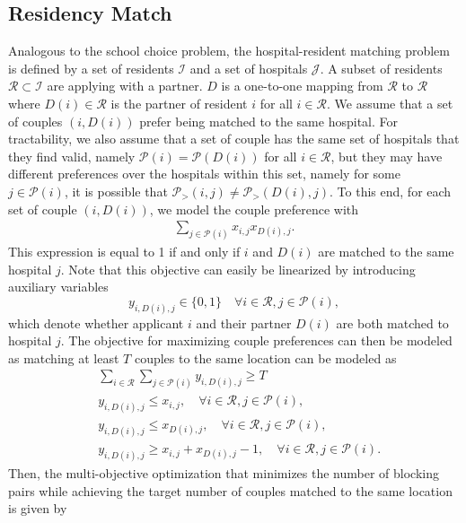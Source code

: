 \documentclass[11pt]{article}
\begin{document}
\subsection{Residency Match}
Analogous to the school choice problem, the hospital-resident matching problem is defined by a set of residents $\mathcal I$ and a set of hospitals $\mathcal J$. A subset of residents $\mathcal R \subset \mathcal I$ are applying with a partner. $D$ is a one-to-one mapping from $\mathcal{R}$ to $\mathcal{R}$ where $D(i) \in \mathcal{R}$ is the partner of resident $i$ for all $i \in \mathcal{R}$. 
We assume that a set of couples $(i, D(i))$ prefer being matched to the same hospital. 
For tractability, we also assume that a set of couple has the same set of hospitals that they find valid, namely $\mathcal P(i) = \mathcal P(D(i))$ for all $i \in \mathcal{R}$, but they may have different preferences over the hospitals within this set, namely for some $j \in \mathcal P(i)$, it is possible that $\mathcal P_>(i,j) \neq \mathcal P_>(D(i),j)$.
To this end, for each set of couple $(i, D(i))$, we model the couple preference with 
\begin{align}
    \sum_{j \in \mathcal P(i)} x_{i,j}x_{D(i),j}.
\end{align}
This expression is equal to 1 if and only if $i$ and $D(i)$ are matched to the same hospital $j$. 
Note that this objective can easily be linearized by introducing auxiliary variables 
$$
y_{i,D(i),j} \in \{0,1\} \quad \forall i \in \mathcal{R}, j \in \mathcal{P}(i), 
$$
which denote whether applicant $i$ and their partner $D(i)$ are both matched to hospital $j$.
The objective for maximizing couple preferences can then be modeled as matching at least $T$ couples to the same location can be modeled as 
\begin{align} 
    & \sum_{i \in \mathcal{R}} \sum_{j \in \mathcal{P}(i)} y_{i,D(i),j} \ge T \\
    &y_{i,D(i),j} \le x_{i,j}, \quad \forall i \in \mathcal{R}, j \in \mathcal{P}(i), \\
    &y_{i,D(i),j} \le x_{D(i),j}, \quad \forall i \in \mathcal{R}, j \in \mathcal{P}(i), \\
    & y_{i,D(i),j} \ge x_{i,j} +  x_{D(i),j} - 1,\quad \forall i \in \mathcal{R}, j \in \mathcal{P}(i). 
\end{align}
Then, the multi-objective optimization that minimizes the number of blocking pairs while achieving the target number of couples matched to the same location is given by 
\end{document}
